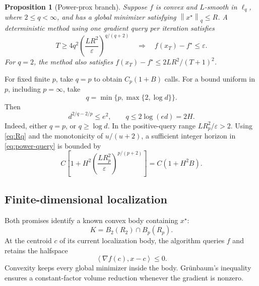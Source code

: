 \documentclass[11pt]{article}
\newcommand{\ip}[2]{\left\langle #1,#2\right\rangle}
\newcommand{\norm}[2]{\left\lVert #1\right\rVert_{#2}}
\newcommand{\eps}{\varepsilon}
\newtheorem{proposition}[proposition]{Proposition}
\theoremstyle{definition}
\theoremstyle{remark}
\begin{document}
\begin{proposition}[Power-prox branch]
\label{prop:power}
Suppose $f$ is convex and $L$-smooth in $\ell_q$, where $2\le q<\infty$,
and has a global minimizer satisfying $\norm{x^\star}{q}\le R$.
A deterministic method using one gradient query per iteration satisfies
\begin{equation}
\label{eq:power-query}
 T\ge4q^2\left(\frac{LR^2}{\eps}\right)^{q/(q+2)}
 \quad\Longrightarrow\quad f(x_T)-f^\star\le\eps.
\end{equation}
For $q=2$, the method also satisfies
$f(x_T)-f^\star\le2LR^2/(T+1)^2$.
\end{proposition}

For fixed finite $p$, take $q=p$ to obtain $C_p(1+B)$ calls.
For a bound uniform in $p$, including $p=\infty$, take
\begin{equation}
\label{eq:q-cap}
 q=\min\{p,\max\{2,\log d\}\}.
\end{equation}
Then
\begin{equation}
\label{eq:q-cap-properties}
 d^{2/q-2/p}\le e^2,\qquad q\le2\log(ed)=2H.
\end{equation}
Indeed, either $q=p$, or $q\ge\log d$.
In the positive-query range $LR_p^2/\eps>2$.
Using \cref{eq:Rq} and the monotonicity of $u/(u+2)$, a sufficient
integer horizon in \cref{eq:power-query} is bounded by
\begin{equation}
\label{eq:power-uniform}
 C\left[1+H^2
 \left(\frac{LR_p^2}{\eps}\right)^{p/(p+2)}\right]
 =C(1+H^2B).
\end{equation}

\subsection{Finite-dimensional localization}

Both promises identify a known convex body containing $x^\star$:
\begin{equation}
\label{eq:known-body}
 K=B_2(R_2)\cap B_p(R_p).
\end{equation}
At the centroid $c$ of its current localization body, the algorithm
queries $f$ and retains the halfspace
\begin{equation}
\label{eq:gradient-cut}
 \ip{\nabla f(c)}{x-c}\le0.
\end{equation}
Convexity keeps every global minimizer inside the body.
Gr\"unbaum's inequality \citep{Grunbaum1960} ensures a constant-factor
volume reduction whenever the gradient is nonzero.
\end{document}
